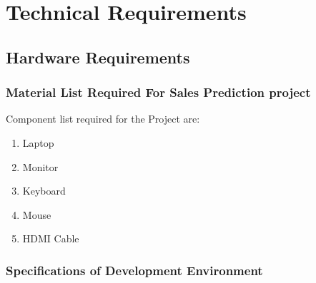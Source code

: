%
%


\chapter{Technical Requirements}

\section{Hardware Requirements}

\subsection{Material List Required For Sales Prediction project }

Component list required for the Project are:
\begin{enumerate}
	\item Laptop
	\item Monitor
	\item Keyboard
	\item Mouse
	\item HDMI Cable
\end{enumerate}

\subsection{Specifications of Development Environment}

